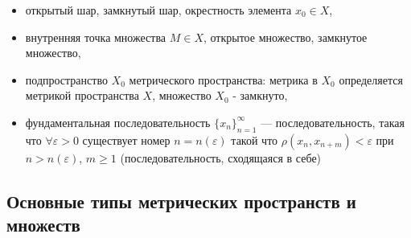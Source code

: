 \documentclass[12pt,a4paper,titlepage]{book}
\theoremstyle{definition}
\theoremstyle{plain}
\theoremstyle{remark}
\theoremstyle{remark}
\theoremstyle{remark}
\theoremstyle{plain}
\begin{document}
\begin{itemize}

	\item  открытый шар, замкнутый шар, окрестность элемента $x_0\in X$,

	\item внутренняя точка множества $M \in X$, открытое множество, замкнутое множество,

	\item подпространство $X_0$ метрического пространства: метрика в $X_0$ определяется метрикой пространства $X$, множество $X_0$ - замкнуто,

	\item фундаментальная последовательность $\lbrace x_n \rbrace_{n=1}^{\infty}$ --- последовательность, такая что $\forall \varepsilon>0$ существует номер $n=n(\varepsilon)$ такой что $\rho(x_n, x_{n+m})<\varepsilon$ при $n>n(\varepsilon)$, $m\geq1$ (последовательность, сходящаяся в себе)

\end{itemize}

\subsection*{Основные типы метрических пространств и множеств}
\end{document}

